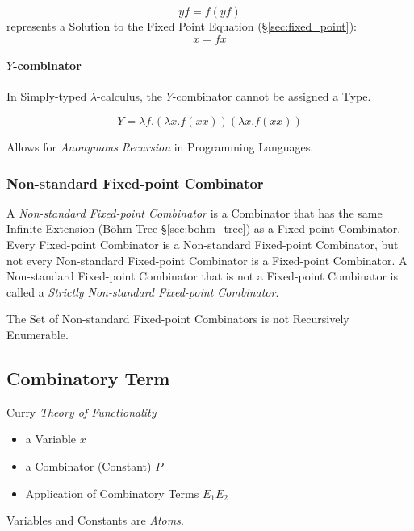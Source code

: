 \[
  y f = f (y f)
\]
represents a Solution to the Fixed Point Equation
(\S\ref{sec:fixed_point}):
\[
  x = f x
\]



\paragraph{$Y$-combinator}\label{sec:y_combinator}\hfill

In Simply-typed $\lambda$-calculus, the $Y$-combinator cannot be
assigned a Type.

\[
  Y = \lambda f.(\lambda x.f (x x)) (\lambda x.f (x x))
\]

Allows for \emph{Anonymous Recursion} in Programming Languages.



\subsubsection{Non-standard Fixed-point Combinator}
\label{sec:nonstandard_combinator}

A \emph{Non-standard Fixed-point Combinator} is a Combinator that has
the same Infinite Extension (B\"ohm Tree \S\ref{sec:bohm_tree}) as a
Fixed-point Combinator. Every Fixed-point Combinator is a Non-standard
Fixed-point Combinator, but not every Non-standard Fixed-point
Combinator is a Fixed-point Combinator. A Non-standard Fixed-point
Combinator that is not a Fixed-point Combinator is called a
\emph{Strictly Non-standard Fixed-point Combinator}.

The Set of Non-standard Fixed-point Combinators is not Recursively
Enumerable. \cite{goldberg05}



\subsection{Combinatory Term}\label{sec:combinatory_term}

Curry \emph{Theory of Functionality}

\begin{itemize}
  \item a Variable $x$
  \item a Combinator (Constant) $P$
  \item Application of Combinatory Terms $E_1 E_2$
\end{itemize}
Variables and Constants are \emph{Atoms}.



